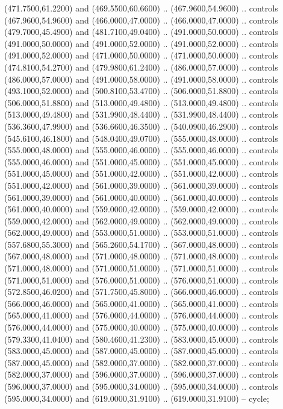{\begin{scope}[y=0.80pt, x=0.80pt, yscale=-1, xscale=1, inner sep=0pt, outer sep=0pt, #1]
      (471.7500,61.2200) and (469.5500,60.6600) .. (467.9600,54.9600) .. controls
      (467.9600,54.9600) and (466.0000,47.0000) .. (466.0000,47.0000) .. controls
      (479.7000,45.4900) and (481.7100,49.0400) .. (491.0000,50.0000) .. controls
      (491.0000,50.0000) and (491.0000,52.0000) .. (491.0000,52.0000) .. controls
      (491.0000,52.0000) and (471.0000,50.0000) .. (471.0000,50.0000) .. controls
      (474.8100,54.2700) and (479.9800,61.2400) .. (486.0000,57.0000) .. controls
      (486.0000,57.0000) and (491.0000,58.0000) .. (491.0000,58.0000) .. controls
      (493.1000,52.0000) and (500.8100,53.4700) .. (506.0000,51.8800) .. controls
      (506.0000,51.8800) and (513.0000,49.4800) .. (513.0000,49.4800) .. controls
      (513.0000,49.4800) and (531.9900,48.4400) .. (531.9900,48.4400) .. controls
      (536.3600,47.9900) and (536.6600,46.3500) .. (540.0900,46.2900) .. controls
      (545.6100,46.1800) and (548.0400,49.0700) .. (555.0000,48.0000) .. controls
      (555.0000,48.0000) and (555.0000,46.0000) .. (555.0000,46.0000) .. controls
      (555.0000,46.0000) and (551.0000,45.0000) .. (551.0000,45.0000) .. controls
      (551.0000,45.0000) and (551.0000,42.0000) .. (551.0000,42.0000) .. controls
      (551.0000,42.0000) and (561.0000,39.0000) .. (561.0000,39.0000) .. controls
      (561.0000,39.0000) and (561.0000,40.0000) .. (561.0000,40.0000) .. controls
      (561.0000,40.0000) and (559.0000,42.0000) .. (559.0000,42.0000) .. controls
      (559.0000,42.0000) and (562.0000,49.0000) .. (562.0000,49.0000) .. controls
      (562.0000,49.0000) and (553.0000,51.0000) .. (553.0000,51.0000) .. controls
      (557.6800,55.3000) and (565.2600,54.1700) .. (567.0000,48.0000) .. controls
      (567.0000,48.0000) and (571.0000,48.0000) .. (571.0000,48.0000) .. controls
      (571.0000,48.0000) and (571.0000,51.0000) .. (571.0000,51.0000) .. controls
      (571.0000,51.0000) and (576.0000,51.0000) .. (576.0000,51.0000) .. controls
      (572.8500,46.0200) and (571.7500,45.8000) .. (566.0000,46.0000) .. controls
      (566.0000,46.0000) and (565.0000,41.0000) .. (565.0000,41.0000) .. controls
      (565.0000,41.0000) and (576.0000,44.0000) .. (576.0000,44.0000) .. controls
      (576.0000,44.0000) and (575.0000,40.0000) .. (575.0000,40.0000) .. controls
      (579.3300,41.0400) and (580.4600,41.2300) .. (583.0000,45.0000) .. controls
      (583.0000,45.0000) and (587.0000,45.0000) .. (587.0000,45.0000) .. controls
      (587.0000,45.0000) and (582.0000,37.0000) .. (582.0000,37.0000) .. controls
      (582.0000,37.0000) and (596.0000,37.0000) .. (596.0000,37.0000) .. controls
      (596.0000,37.0000) and (595.0000,34.0000) .. (595.0000,34.0000) .. controls
      (595.0000,34.0000) and (619.0000,31.9100) .. (619.0000,31.9100) -- cycle;


\end{scope}}
